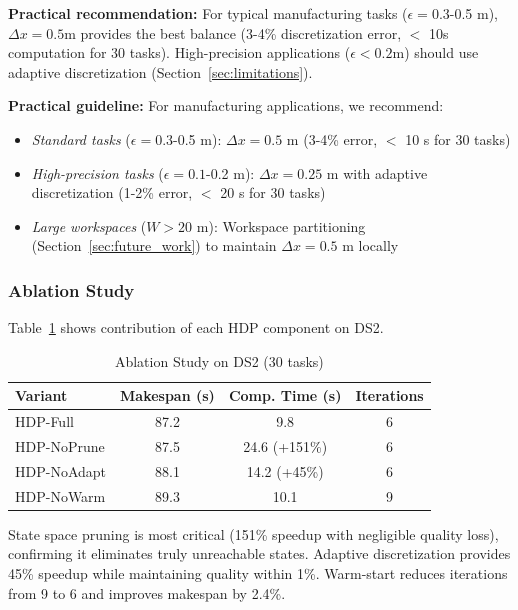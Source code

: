 \documentclass[manuscript,screen,review]{acmart}
\begin{document}
\textbf{Practical recommendation:} For typical manufacturing tasks 
($\epsilon = 0.3$-0.5 m), $\Delta x = 0.5$m provides the best balance 
(3-4\% discretization error, $<$ 10s computation for 30 tasks). High-precision 
applications ($\epsilon < 0.2$m) should use adaptive discretization 
(Section~\ref{sec:limitations}).

\textbf{Practical guideline:} For manufacturing applications, we recommend:
\begin{itemize}[leftmargin=*, itemsep=2pt]
    \item \textit{Standard tasks} ($\epsilon = 0.3$-0.5 m): $\Delta x = 0.5$ m 
    (3-4\% error, $<$ 10 s for 30 tasks)
    \item \textit{High-precision tasks} ($\epsilon = 0.1$-0.2 m): $\Delta x = 0.25$ m 
    with adaptive discretization (1-2\% error, $<$ 20 s for 30 tasks)
    \item \textit{Large workspaces} ($W > 20$ m): Workspace partitioning 
    (Section~\ref{sec:future_work}) to maintain $\Delta x = 0.5$ m locally
\end{itemize}

\subsubsection{Ablation Study}
\label{sec:ablation}

Table~\ref{tab:ablation} shows contribution of each HDP component on DS2.

\begin{table}[t]
\centering
\caption{Ablation Study on DS2 (30 tasks)}
\label{tab:ablation}
\small
\begin{tabular}{l|ccc}
\toprule
\textbf{Variant} & \textbf{Makespan (s)} & \textbf{Comp. Time (s)} & \textbf{Iterations} \\
\midrule
HDP-Full & 87.2 & 9.8 & 6 \\
HDP-NoPrune & 87.5 & 24.6 (+151\%) & 6 \\
HDP-NoAdapt & 88.1 & 14.2 (+45\%) & 6 \\
HDP-NoWarm & 89.3 & 10.1 & 9 \\
\bottomrule
\end{tabular}
\end{table}

State space pruning is most critical (151\% speedup with negligible quality 
loss), confirming it eliminates truly unreachable states. Adaptive discretization 
provides 45\% speedup while maintaining quality within 1\%. Warm-start reduces 
iterations from 9 to 6 and improves makespan by 2.4\%.
\end{document}
